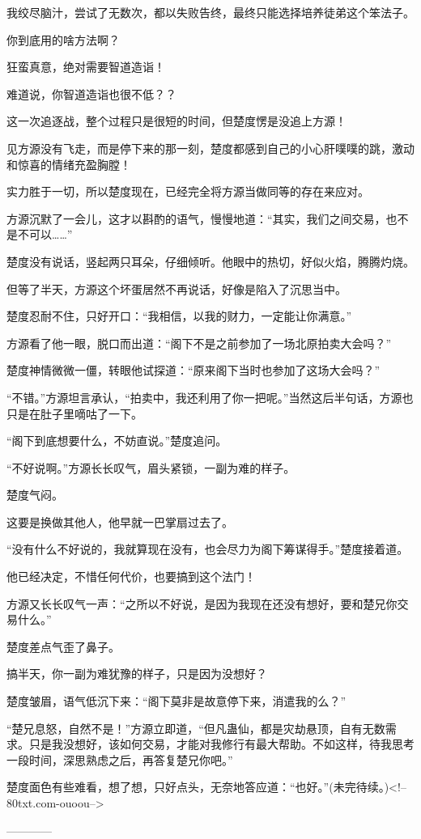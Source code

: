 \begin{this_body}
我绞尽脑汁，尝试了无数次，都以失败告终，最终只能选择培养徒弟这个笨法子。

你到底用的啥方法啊？

狂蛮真意，绝对需要智道造诣！

难道说，你智道造诣也很不低？？

这一次追逐战，整个过程只是很短的时间，但楚度愣是没追上方源！

见方源没有飞走，而是停下来的那一刻，楚度都感到自己的小心肝噗噗的跳，激动和惊喜的情绪充盈胸膛！

实力胜于一切，所以楚度现在，已经完全将方源当做同等的存在来应对。

方源沉默了一会儿，这才以斟酌的语气，慢慢地道：“其实，我们之间交易，也不是不可以……”

楚度没有说话，竖起两只耳朵，仔细倾听。他眼中的热切，好似火焰，腾腾灼烧。

但等了半天，方源这个坏蛋居然不再说话，好像是陷入了沉思当中。

楚度忍耐不住，只好开口：“我相信，以我的财力，一定能让你满意。”

方源看了他一眼，脱口而出道：“阁下不是之前参加了一场北原拍卖大会吗？”

楚度神情微微一僵，转眼他试探道：“原来阁下当时也参加了这场大会吗？”

“不错。”方源坦言承认，“拍卖中，我还利用了你一把呢。”当然这后半句话，方源也只是在肚子里嘀咕了一下。

“阁下到底想要什么，不妨直说。”楚度追问。

“不好说啊。”方源长长叹气，眉头紧锁，一副为难的样子。

楚度气闷。

这要是换做其他人，他早就一巴掌扇过去了。

“没有什么不好说的，我就算现在没有，也会尽力为阁下筹谋得手。”楚度接着道。

他已经决定，不惜任何代价，也要搞到这个法门！

方源又长长叹气一声：“之所以不好说，是因为我现在还没有想好，要和楚兄你交易什么。”

楚度差点气歪了鼻子。

搞半天，你一副为难犹豫的样子，只是因为没想好？

楚度皱眉，语气低沉下来：“阁下莫非是故意停下来，消遣我的么？”

“楚兄息怒，自然不是！”方源立即道，“但凡蛊仙，都是灾劫悬顶，自有无数需求。只是我没想好，该如何交易，才能对我修行有最大帮助。不如这样，待我思考一段时间，深思熟虑之后，再答复楚兄你吧。”

楚度面色有些难看，想了想，只好点头，无奈地答应道：“也好。”(未完待续。)<!--80txt.com-ouoou-->

------------

\end{this_body}

